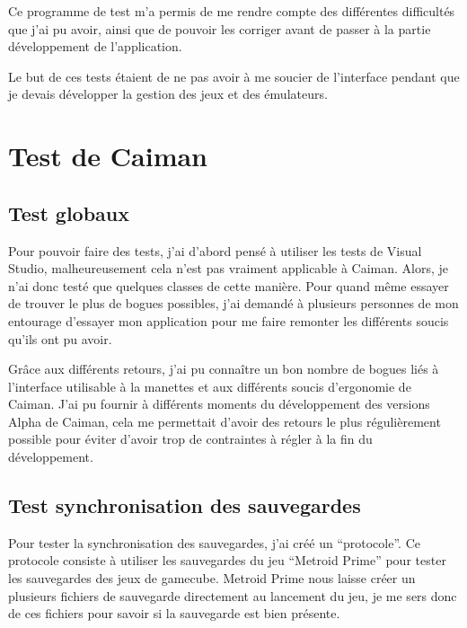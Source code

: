 \documentclass[a4paper,12pt,french]{sphinxmanual}
\begin{document}
\sphinxAtStartPar
{}

\sphinxAtStartPar
{}

\sphinxAtStartPar
Ce programme de test m’a permis de me rendre compte des différentes difficultés que j’ai pu avoir, ainsi que de pouvoir les corriger avant de passer à la partie développement de l’application.

\sphinxAtStartPar
Le but de ces tests étaient de ne pas avoir à me soucier de l’interface pendant que je devais développer la gestion des jeux et des émulateurs.


\section{Test de Caiman}
\label{\detokenize{test:test-de-caiman}}

\subsection{Test globaux}
\label{\detokenize{test:test-globaux}}
\sphinxAtStartPar
Pour pouvoir faire des tests, j’ai d’abord pensé à utiliser les tests de Visual Studio, malheureusement cela n’est pas vraiment applicable à Caiman. Alors, je n’ai donc testé que quelques classes de cette manière. Pour quand même essayer de trouver le plus de bogues possibles, j’ai demandé à plusieurs personnes de mon entourage d’essayer mon application pour me faire remonter les différents soucis qu’ils ont pu avoir.

\sphinxAtStartPar
Grâce aux différents retours, j’ai pu connaître un bon nombre de bogues liés à l’interface utilisable à la manettes et aux différents soucis d’ergonomie de Caiman. J’ai pu fournir à différents moments du développement des versions Alpha de Caiman, cela me permettait d’avoir des retours le plus régulièrement possible pour éviter d’avoir trop de contraintes à régler à la fin du développement.


\subsection{Test synchronisation des sauvegardes}
\label{\detokenize{test:test-synchronisation-des-sauvegardes}}
\sphinxAtStartPar
Pour tester la synchronisation des sauvegardes, j’ai créé un “protocole”. Ce protocole consiste à utiliser les sauvegardes du jeu “Metroid Prime” pour tester les sauvegardes des jeux de gamecube. Metroid Prime nous laisse créer un plusieurs fichiers de sauvegarde directement au lancement du jeu, je me sers donc de ces fichiers pour savoir si la sauvegarde est bien présente.
\end{document}
